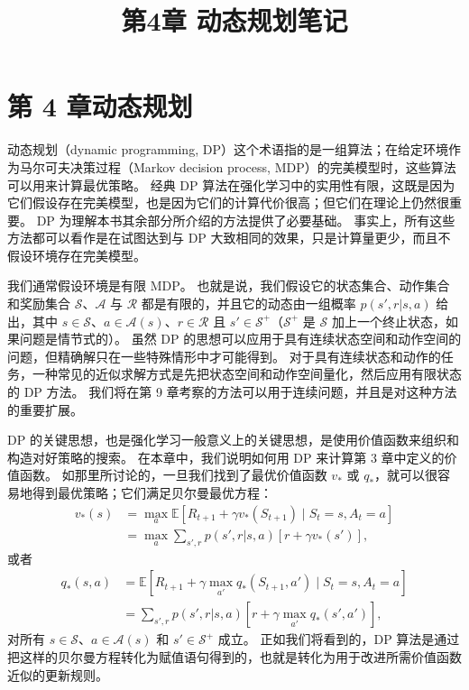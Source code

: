 \documentclass[UTF8,12pt,a4paper,fontset=fandol]{ctexart}
\title{第4章 动态规划笔记}
\author{}
\date{}
\begin{document}
\maketitle

\section*{第 4 章\quad 动态规划}

动态规划（dynamic programming, DP）这个术语指的是一组算法；在给定环境作为马尔可夫决策过程（Markov decision process, MDP）的完美模型时，这些算法可以用来计算最优策略。
经典 DP 算法在强化学习中的实用性有限，这既是因为它们假设存在完美模型，也是因为它们的计算代价很高；但它们在理论上仍然很重要。
DP 为理解本书其余部分所介绍的方法提供了必要基础。
事实上，所有这些方法都可以看作是在试图达到与 DP 大致相同的效果，只是计算量更少，而且不假设环境存在完美模型。

我们通常假设环境是有限 MDP。
也就是说，我们假设它的状态集合、动作集合和奖励集合 $\mathcal{S}$、$\mathcal{A}$ 与 $\mathcal{R}$ 都是有限的，并且它的动态由一组概率 $p(s',r|s,a)$ 给出，其中 $s\in\mathcal{S}$、$a\in\mathcal{A}(s)$、$r\in\mathcal{R}$ 且 $s'\in\mathcal{S}^+$（$\mathcal{S}^+$ 是 $\mathcal{S}$ 加上一个终止状态，如果问题是情节式的）。
虽然 DP 的思想可以应用于具有连续状态空间和动作空间的问题，但精确解只在一些特殊情形中才可能得到。
对于具有连续状态和动作的任务，一种常见的近似求解方式是先把状态空间和动作空间量化，然后应用有限状态的 DP 方法。
我们将在第 9 章考察的方法可以用于连续问题，并且是对这种方法的重要扩展。

DP 的关键思想，也是强化学习一般意义上的关键思想，是使用价值函数来组织和构造对好策略的搜索。
在本章中，我们说明如何用 DP 来计算第 3 章中定义的价值函数。
如那里所讨论的，一旦我们找到了最优价值函数 $v_*$ 或 $q_*$，就可以很容易地得到最优策略；它们满足贝尔曼最优方程：
\begin{equation}
\begin{aligned}
v_*(s)
&= \max_a \mathbb{E}\!\left[R_{t+1}+\gamma v_*(S_{t+1}) \mid S_t=s,A_t=a\right] \\
&= \max_a \sum_{s',r} p(s',r|s,a)\left[r+\gamma v_*(s')\right],
\end{aligned}
\tag{4.1}
\end{equation}
或者
\begin{equation}
\begin{aligned}
q_*(s,a)
&= \mathbb{E}\!\left[R_{t+1}+\gamma\max_{a'}q_*(S_{t+1},a') \mid S_t=s,A_t=a\right] \\
&= \sum_{s',r} p(s',r|s,a)\left[r+\gamma\max_{a'}q_*(s',a')\right],
\end{aligned}
\tag{4.2}
\end{equation}
对所有 $s\in\mathcal{S}$、$a\in\mathcal{A}(s)$ 和 $s'\in\mathcal{S}^+$ 成立。
正如我们将看到的，DP 算法是通过把这样的贝尔曼方程转化为赋值语句得到的，也就是转化为用于改进所需价值函数近似的更新规则。
\end{document}
